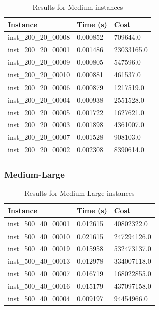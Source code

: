 \documentclass{article}
\begin{document}
\begin{table}[H]
\centering
\begin{tabular}{|l|l|l|}
\hline
\textbf{Instance}         & \textbf{Time (s)} & \textbf{Cost} \\ \hline
inst\_200\_20\_00008 & 0.000852 & 709644.0   \\ \hline
inst\_200\_20\_00001 & 0.001486 & 23033165.0 \\ \hline
inst\_200\_20\_00009 & 0.000805 & 547596.0   \\ \hline
inst\_200\_20\_00010 & 0.000881 & 461537.0   \\ \hline
inst\_200\_20\_00006 & 0.000879 & 1217519.0  \\ \hline
inst\_200\_20\_00004 & 0.000938 & 2551528.0  \\ \hline
inst\_200\_20\_00005 & 0.001722 & 1627621.0  \\ \hline
inst\_200\_20\_00003 & 0.001898 & 4361007.0  \\ \hline
inst\_200\_20\_00007 & 0.001528 & 908103.0   \\ \hline
inst\_200\_20\_00002 & 0.002308 & 8390614.0  \\ \hline
\end{tabular}
\caption{Results for Medium instances}
\end{table}

\subsubsection*{Medium-Large}
\begin{table}[h!]
\centering
\begin{tabular}{|l|l|l|}
\hline
\textbf{Instance}         & \textbf{Time (s)} & \textbf{Cost} \\ \hline
inst\_500\_40\_00001 & 0.012615 & 40802322.0  \\ \hline
inst\_500\_40\_00010 & 0.021615 & 247294126.0 \\ \hline
inst\_500\_40\_00019 & 0.015958 & 532473137.0 \\ \hline
inst\_500\_40\_00013 & 0.012978 & 334007118.0 \\ \hline
inst\_500\_40\_00007 & 0.016719 & 168022855.0 \\ \hline
inst\_500\_40\_00016 & 0.015179 & 437097158.0 \\ \hline
inst\_500\_40\_00004 & 0.009197 & 94454966.0  \\ \hline
\end{tabular}
\caption{Results for Medium-Large instances}
\end{table}
\end{document}
